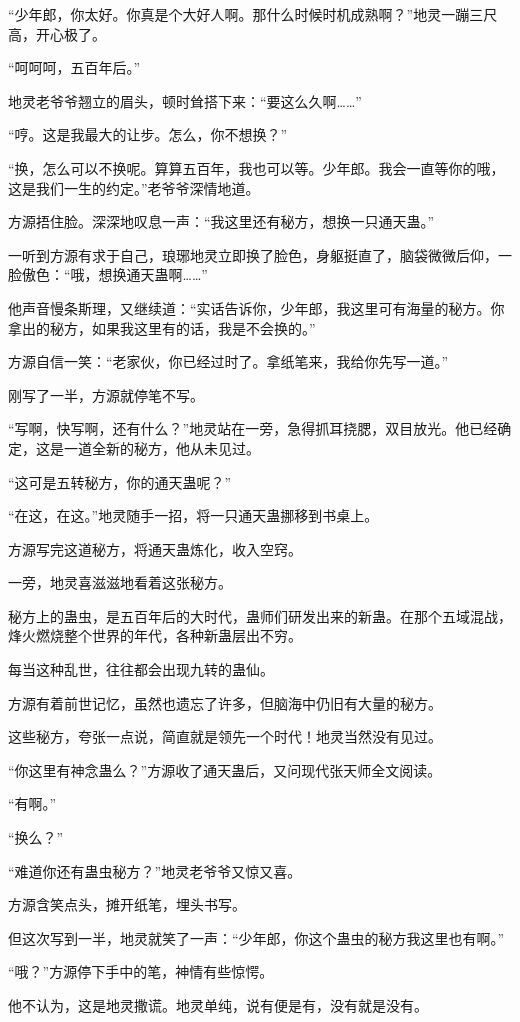 \begin{this_body}
“少年郎，你太好。你真是个大好人啊。那什么时候时机成熟啊？”地灵一蹦三尺高，开心极了。

“呵呵呵，五百年后。”

地灵老爷爷翘立的眉头，顿时耸搭下来：“要这么久啊……”

“哼。这是我最大的让步。怎么，你不想换？”

“换，怎么可以不换呢。算算五百年，我也可以等。少年郎。我会一直等你的哦，这是我们一生的约定。”老爷爷深情地道。

方源捂住脸。深深地叹息一声：“我这里还有秘方，想换一只通天蛊。”

一听到方源有求于自己，琅琊地灵立即换了脸色，身躯挺直了，脑袋微微后仰，一脸傲色：“哦，想换通天蛊啊……”

他声音慢条斯理，又继续道：“实话告诉你，少年郎，我这里可有海量的秘方。你拿出的秘方，如果我这里有的话，我是不会换的。”

方源自信一笑：“老家伙，你已经过时了。拿纸笔来，我给你先写一道。”

刚写了一半，方源就停笔不写。

“写啊，快写啊，还有什么？”地灵站在一旁，急得抓耳挠腮，双目放光。他已经确定，这是一道全新的秘方，他从未见过。

“这可是五转秘方，你的通天蛊呢？”

“在这，在这。”地灵随手一招，将一只通天蛊挪移到书桌上。

方源写完这道秘方，将通天蛊炼化，收入空窍。

一旁，地灵喜滋滋地看着这张秘方。

秘方上的蛊虫，是五百年后的大时代，蛊师们研发出来的新蛊。在那个五域混战，烽火燃烧整个世界的年代，各种新蛊层出不穷。

每当这种乱世，往往都会出现九转的蛊仙。

方源有着前世记忆，虽然也遗忘了许多，但脑海中仍旧有大量的秘方。

这些秘方，夸张一点说，简直就是领先一个时代！地灵当然没有见过。

“你这里有神念蛊么？”方源收了通天蛊后，又问现代张天师全文阅读。

“有啊。”

“换么？”

“难道你还有蛊虫秘方？”地灵老爷爷又惊又喜。

方源含笑点头，摊开纸笔，埋头书写。

但这次写到一半，地灵就笑了一声：“少年郎，你这个蛊虫的秘方我这里也有啊。”

“哦？”方源停下手中的笔，神情有些惊愕。

他不认为，这是地灵撒谎。地灵单纯，说有便是有，没有就是没有。


\end{this_body}
